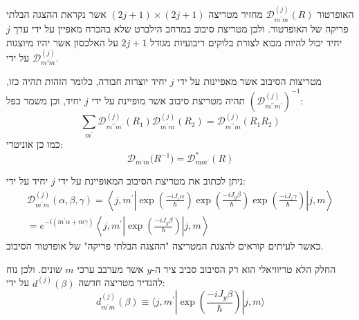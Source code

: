 \documentclass{tstextbook}
\begin{document}
\begin{remark}
האופרטור \({\mathcal{D}}_{m^{\prime}m}^{(j)}(R)\) מחזיר מטריצה \((2j+1)\times (2j+1)\) אשר נקראת ההצגה הבלתי פריקה של האופרטור. ולכן מטריצת סיבוב במרחב הילברט שלא בהכרח מאפיין על ידי ערך \(j\) יחיד יכול להיות מבוא לצורת בלוקים ריבועיות מגודל \(2j+1\) על האלכסון אשר יהיו מיוצגות על ידי \(\mathcal{D}^{(j)}_{m'm}\).

\end{remark}
\begin{proposition}
מטריצות הסיבוב אשר מאפיינות על ידי \(j\) יחיד יוצרות חבורה, כלומר הזהות תהיה כזו,  \((\mathcal{D}_{m^{\prime\prime}m^{\prime}}^{(j)})^{-1}\) תהיה מטריצת סיבוב אשר מופיינת על ידי \(j\) יחיד, וכן משמר כפל:
$$\sum_{m^{\prime}}\mathcal{D}_{m^{\prime\prime}m^{\prime}}^{(j)}(R_{1})\mathcal{D}_{m^{\prime}m}^{(j)}(R_{2})=\mathcal{D}_{m^{\prime\prime}m}^{(j)}(R_{1}R_{2})$$
כמו כן אוניטרי:
$$\mathcal{D}_{m^{\prime}m}\big(R^{-1}\big)=\mathcal{D}_{m m^{\prime}}^{*}(R)$$

\end{proposition}
\begin{proposition}
ניתן לכתוב את מטריצת הסיבוב המאופיינת על ידי \(j\) יחיד על ידי:
$$\begin{gather}\mathcal{D}_{m^{\prime}m}^{(j)}\left( \alpha,\beta,\gamma \right)=\left\langle  j,m^{\prime}|\exp\left(\frac{-iJ_{z}\alpha}{\hbar}\right)\exp\left(\frac{-iJ_{y}\beta}{\hbar}\right)\exp\left(\frac{-iJ_{z}\gamma}{\hbar}\right)|j,m \right\rangle\\=e^{-i\left( m^{\prime}\alpha+m\gamma \right)}\left\langle  j,m^{\prime}|\exp\left(\frac{-iJ_{y}\beta}{\hbar}\right)|j,m \right\rangle 
\end{gather}$$
כאשר לעיתים קוראים להצגת המטריצה "ההצגה הבלתי פריקה" של אופרטור הסיבוב.

\end{proposition}
\begin{symbolize}
החלק הלא טריוויאלי הוא רק הסיבוב סביב ציר ה-\(y\) אשר מערבב ערכי \(m\) שונים. ולכן נוח להגדיר מטריצה חדשה \(d^{(j)}\left( \beta \right)\) על ידי:
$$d_{m^{\prime}m}^{(j)}(\beta)\equiv\langle j,m^{\prime}|\exp\left(\frac{-i J_{y}\beta}{\hbar}\right)|j,m\rangle$$

\end{symbolize}
\end{document}
